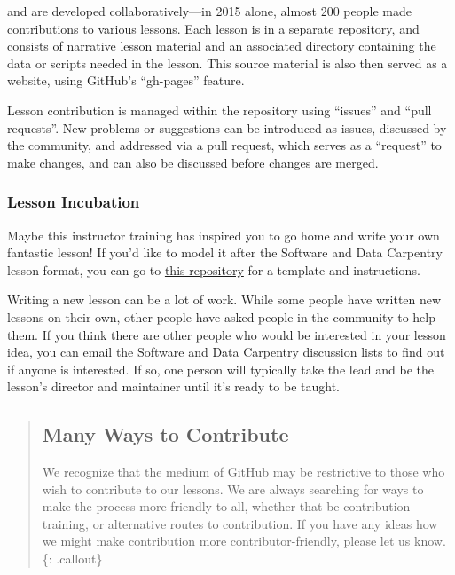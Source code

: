 and are developed collaboratively---in 2015 alone, almost 200 people
made contributions to various lessons. Each lesson is in a separate
repository, and consists of narrative lesson material and an associated
directory containing the data or scripts needed in the lesson. This
source material is also then served as a website, using GitHub's
``gh-pages'' feature.

Lesson contribution is managed within the repository using ``issues''
and ``pull requests''. New problems or suggestions can be introduced as
issues, discussed by the community, and addressed via a pull request,
which serves as a ``request'' to make changes, and can also be discussed
before changes are merged.

\subsubsection{Lesson Incubation}\label{lesson-incubation}

Maybe this instructor training has inspired you to go home and write
your own fantastic lesson! If you'd like to model it after the Software
and Data Carpentry lesson format, you can go to
\href{\{\{\%20site.example\_repo\%20\}\}}{this repository} for a template
and instructions.

Writing a new lesson can be a lot of work. While some people have
written new lessons on their own, other people have asked people in the
community to help them. If you think there are other people who would be
interested in your lesson idea, you can email the Software and Data
Carpentry discussion lists to find out if anyone is interested. If so,
one person will typically take the lead and be the lesson's director and
maintainer until it's ready to be taught.

\begin{quote}
\subsection{Many Ways to Contribute}\label{many-ways-to-contribute}

We recognize that the medium of GitHub may be restrictive to those who
wish to contribute to our lessons. We are always searching for ways to
make the process more friendly to all, whether that be contribution
training, or alternative routes to contribution. If you have any ideas
how we might make contribution more contributor-friendly, please let us
know. \{: .callout\}
\end{quote}

